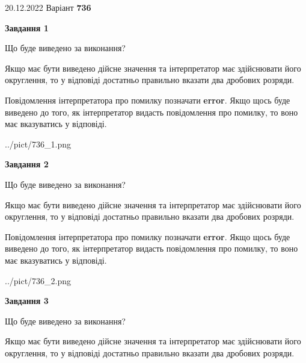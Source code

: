\documentclass[12pt, ukrainian]{article}
\begin{document}
{20.12.2022 Варіант \No \textbf { 736 }\par}
{
\begin {Large}

{\begin {center}\textbf{Завдання 1}\end {center}}\par
Що буде виведено за виконання? \par

Якщо має бути виведено дійсне значення та інтерпретатор має здійснювати його округлення, 
то у відповіді достатньо правильно вказати два дробових розряди.

Повідомлення інтерпретатора про помилку позначати \textbf{error}.
Якщо щось буде виведено до того, як інтерпретатор видасть повідомлення про помилку, 
то воно має вказуватись у відповіді. \par

\begin{center}
	{../pict/736_1.png}
\end{center}
\newpage

{\begin {center}\textbf{Завдання 2}\end {center}}\par
Що буде виведено за виконання? \par

Якщо має бути виведено дійсне значення та інтерпретатор має здійснювати його округлення, 
то у відповіді достатньо правильно вказати два дробових розряди.

Повідомлення інтерпретатора про помилку позначати \textbf{error}.
Якщо щось буде виведено до того, як інтерпретатор видасть повідомлення про помилку, 
то воно має вказуватись у відповіді. \par

\begin{center}
	{../pict/736_2.png}
\end{center}
\newpage

{\begin {center}\textbf{Завдання 3}\end {center}}\par
Що буде виведено за виконання? \par

Якщо має бути виведено дійсне значення та інтерпретатор має здійснювати його округлення, 
то у відповіді достатньо правильно вказати два дробових розряди.


\end{Large}}
\end{document}
